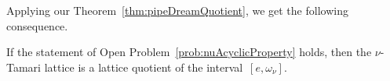 Applying our Theorem~\ref{thm:pipeDreamQuotient}, we get the following consequence.

\begin{corollary}
If the statement of Open Problem~\ref{prob:nuAcyclicProperty} holds, then the $\nu$-Tamari lattice is a lattice quotient of the interval~$[e,\omega_\nu]$.
\end{corollary}  
